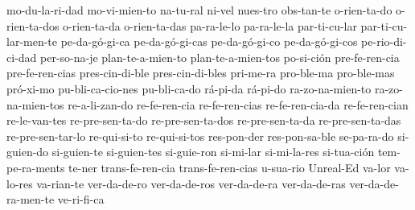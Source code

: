 {mo-du-la-ri-dad
mo-vi-mien-to
na-tu-ral
ni-vel
nues-tro
obs-tan-te
o-rien-ta-do
o-rien-ta-dos
o-rien-ta-da
o-rien-ta-das
pa-ra-le-lo
pa-ra-le-la
par-ti-cu-lar
par-ti-cu-lar-men-te
pe-da-gó-gi-ca
pe-da-gó-gi-cas
pe-da-gó-gi-co
pe-da-gó-gi-cos
pe-rio-di-ci-dad
per-so-na-je
plan-te-a-mien-to
plan-te-a-mien-tos
po-si-ción
pre-fe-ren-cia
pre-fe-ren-cias
pres-cin-di-ble
pres-cin-di-bles
pri-me-ra
pro-ble-ma
pro-ble-mas
pró-xi-mo
pu-bli-ca-cio-nes
pu-bli-ca-do
rá-pi-da
rá-pi-do
ra-zo-na-mien-to
ra-zo-na-mien-tos
re-a-li-zan-do
re-fe-ren-cia
re-fe-ren-cias
re-fe-ren-cia-da
re-fe-ren-cian
re-le-van-tes
re-pre-sen-ta-do
re-pre-sen-ta-dos
re-pre-sen-ta-da
re-pre-sen-ta-das
re-pre-sen-tar-lo
re-qui-si-to
re-qui-si-tos
res-pon-der
res-pon-sa-ble
se-pa-ra-do
si-guien-do
si-guien-te
si-guien-tes
si-guie-ron
si-mi-lar
si-mi-la-res
si-tua-ción
tem-pe-ra-ments
te-ner
trans-fe-ren-cia
trans-fe-ren-cias
u-sua-rio
Unreal-Ed
va-lor
va-lo-res
va-rian-te
ver-da-de-ro
ver-da-de-ros
ver-da-de-ra
ver-da-de-ras
ver-da-de-ra-men-te
ve-ri-fi-ca
}
